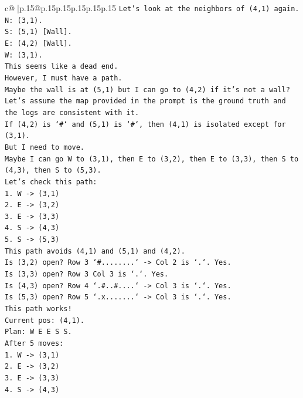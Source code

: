 \documentclass{article}
\begin{document}
{\begin{supertabular}{c@{$\;$}|p{.15\linewidth}@{}p{.15\linewidth}p{.15\linewidth}p{.15\linewidth}p{.15\linewidth}p{.15\linewidth}}
{{{\texttt{Let's look at the neighbors of (4,1) again.} \\
\texttt{N: (3,1).} \\
\texttt{S: (5,1) {[}Wall{]}.} \\
\texttt{E: (4,2) {[}Wall{]}.} \\
\texttt{W: (3,1).} \\
\texttt{This seems like a dead end.} \\
\texttt{However, I must have a path.} \\
\texttt{Maybe the wall is at (5,1) but I can go to (4,2) if it's not a wall?} \\
\texttt{Let's assume the map provided in the prompt is the ground truth and the logs are consistent with it.} \\
\texttt{If (4,2) is `\#` and (5,1) is `\#`, then (4,1) is isolated except for (3,1).} \\
\texttt{But I need to move.} \\
\texttt{Maybe I can go W to (3,1), then E to (3,2), then E to (3,3), then S to (4,3), then S to (5,3).} \\
\texttt{Let's check this path:} \\
\texttt{1. W {-}> (3,1)} \\
\texttt{2. E {-}> (3,2)} \\
\texttt{3. E {-}> (3,3)} \\
\texttt{4. S {-}> (4,3)} \\
\texttt{5. S {-}> (5,3)} \\
\texttt{This path avoids (4,1) and (5,1) and (4,2).} \\
\texttt{Is (3,2) open? Row 3 `\#........` {-}> Col 2 is `.`. Yes.} \\
\texttt{Is (3,3) open? Row 3 Col 3 is `.`. Yes.} \\
\texttt{Is (4,3) open? Row 4 `.\#..\#....` {-}> Col 3 is `.`. Yes.} \\
\texttt{Is (5,3) open? Row 5 `.x.......` {-}> Col 3 is `.`. Yes.} \\
\texttt{This path works!} \\
\texttt{Current pos: (4,1).} \\
\texttt{Plan: W E E S S.} \\
\texttt{After 5 moves:} \\
\texttt{1. W {-}> (3,1)} \\
\texttt{2. E {-}> (3,2)} \\
\texttt{3. E {-}> (3,3)} \\
\texttt{4. S {-}> (4,3)} \\
}}}
\end{supertabular}}
\end{document}
